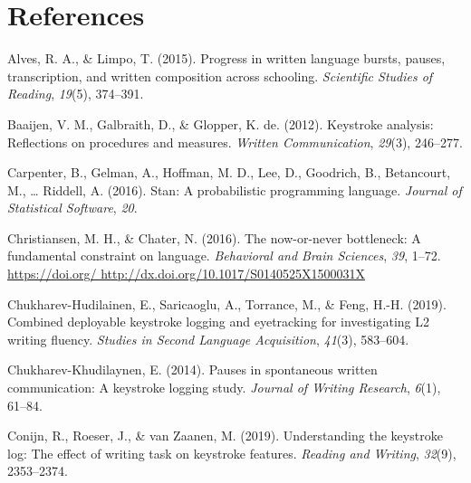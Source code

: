 \documentclass[english,jou,floatsintext]{apa7}
\begin{document}
\hypertarget{references}{%
\section{References}\label{references}}

\begingroup
\setlength{\parindent}{-0.5in}
\setlength{\leftskip}{0.5in}

\hypertarget{ref}{}

\endgroup

\hypertarget{refs}{}
\leavevmode\hypertarget{ref-alves2015progress}{}%
Alves, R. A., \& Limpo, T. (2015). Progress in written language bursts, pauses, transcription, and written composition across schooling. \emph{Scientific Studies of Reading}, \emph{19}(5), 374--391.

\leavevmode\hypertarget{ref-baaijen2012keystroke}{}%
Baaijen, V. M., Galbraith, D., \& Glopper, K. de. (2012). Keystroke analysis: Reflections on procedures and measures. \emph{Written Communication}, \emph{29}(3), 246--277.

\leavevmode\hypertarget{ref-carpenter2016stan}{}%
Carpenter, B., Gelman, A., Hoffman, M. D., Lee, D., Goodrich, B., Betancourt, M., \ldots{} Riddell, A. (2016). Stan: A probabilistic programming language. \emph{Journal of Statistical Software}, \emph{20}.

\leavevmode\hypertarget{ref-christiansen2016now}{}%
Christiansen, M. H., \& Chater, N. (2016). The now-or-never bottleneck: A fundamental constraint on language. \emph{Behavioral and Brain Sciences}, \emph{39}, 1--72. \href{https://doi.org/\%20http://dx.doi.org/10.1017/S0140525X1500031X}{https://doi.org/ http://dx.doi.org/10.1017/S0140525X1500031X}

\leavevmode\hypertarget{ref-chukharev2019combined}{}%
Chukharev-Hudilainen, E., Saricaoglu, A., Torrance, M., \& Feng, H.-H. (2019). Combined deployable keystroke logging and eyetracking for investigating L2 writing fluency. \emph{Studies in Second Language Acquisition}, \emph{41}(3), 583--604.

\leavevmode\hypertarget{ref-chukharev2014pauses}{}%
Chukharev-Khudilaynen, E. (2014). Pauses in spontaneous written communication: A keystroke logging study. \emph{Journal of Writing Research}, \emph{6}(1), 61--84.

\leavevmode\hypertarget{ref-conijn2019understanding}{}%
Conijn, R., Roeser, J., \& van Zaanen, M. (2019). Understanding the keystroke log: The effect of writing task on keystroke features. \emph{Reading and Writing}, \emph{32}(9), 2353--2374.
\end{document}
